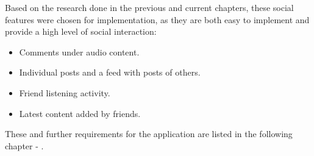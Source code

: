 Based on the research done in the previous and current chapters, these social features were chosen for implementation,
as they are both easy to implement and provide a high level of social interaction:

\begin{itemize}
    \item Comments under audio content.
    \item Individual posts and a feed with posts of others.
    \item Friend listening activity.
    \item Latest content added by friends.
\end{itemize}

These and further requirements for the application are listed in the following chapter - .